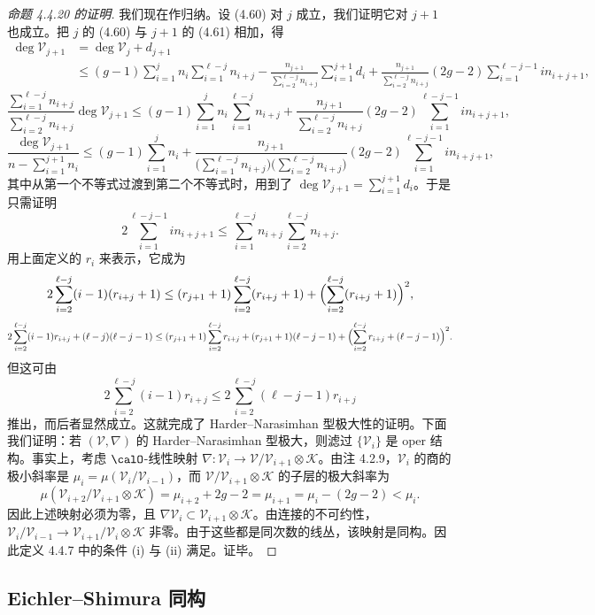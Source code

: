 \begin{proof}[命题 4.4.20 的证明]
我们现在作归纳。设 (4.60) 对 $j$ 成立，我们证明它对 $j+1$ 也成立。把 $j$ 的 (4.60) 与 $j+1$ 的 (4.61) 相加，得
\[
\begin{aligned}
\deg\mathcal{V}_{j+1}&=\deg\mathcal{V}_j+d_{j+1}\\
&\le(g-1)\sum_{i=1}^j n_i\sum_{i=1}^{\ell-j}n_{i+j}-\frac{n_{j+1}}{\sum_{i=2}^{\ell-j}n_{i+j}}\sum_{i=1}^{j+1}d_i+\frac{n_{j+1}}{\sum_{i=2}^{\ell-j}n_{i+j}}(2g-2)\sum_{i=1}^{\ell-j-1}in_{i+j+1},
\end{aligned}
\]
\[
\frac{\sum_{i=1}^{\ell-j}n_{i+j}}{\sum_{i=2}^{\ell-j}n_{i+j}}\deg\mathcal{V}_{j+1}\le(g-1)\sum_{i=1}^j n_i\sum_{i=1}^{\ell-j}n_{i+j}+\frac{n_{j+1}}{\sum_{i=2}^{\ell-j}n_{i+j}}(2g-2)\sum_{i=1}^{\ell-j-1}in_{i+j+1},
\]
\[
\frac{\deg\mathcal{V}_{j+1}}{n-\sum_{i=1}^{j+1}n_i}\le(g-1)\sum_{i=1}^j n_i+\frac{n_{j+1}}{\bigl(\sum_{i=1}^{\ell-j}n_{i+j}\bigr)\bigl(\sum_{i=2}^{\ell-j}n_{i+j}\bigr)}(2g-2)\sum_{i=1}^{\ell-j-1}in_{i+j+1},
\]
其中从第一个不等式过渡到第二个不等式时，用到了 $\deg\mathcal{V}_{j+1}=\sum_{i=1}^{j+1}d_i$。于是只需证明
\[
2\sum_{i=1}^{\ell-j-1}in_{i+j+1}\le\sum_{i=1}^{\ell-j}n_{i+j}\sum_{i=2}^{\ell-j}n_{i+j}.
\]
用上面定义的 $r_i$ 来表示，它成为
\[
2\sum_{i=2}^{\ell-j}(i-1)(r_{i+j}+1)\le(r_{j+1}+1)\sum_{i=2}^{\ell-j}(r_{i+j}+1)+\Bigl(\sum_{i=2}^{\ell-j}(r_{i+j}+1)\Bigr)^2,
\]
\[
2\sum_{i=2}^{\ell-j}(i-1)r_{i+j}+(\ell-j)(\ell-j-1)\le(r_{j+1}+1)\sum_{i=2}^{\ell-j}r_{i+j}+(r_{j+1}+1)(\ell-j-1)+\Bigl(\sum_{i=2}^{\ell-j}r_{i+j}+(\ell-j-1)\Bigr)^2.
\]
但这可由
\[
2\sum_{i=2}^{\ell-j}(i-1)r_{i+j}\le2\sum_{i=2}^{\ell-j}(\ell-j-1)r_{i+j}
\]
推出，而后者显然成立。这就完成了 Harder--Narasimhan 型极大性的证明。下面我们证明：若 $(\mathcal{V},\nabla)$ 的 Harder--Narasimhan 型极大，则滤过 $\{\mathcal{V}_i\}$ 是 oper 结构。事实上，考虑 $\calO$-线性映射 $\nabla\colon\mathcal{V}_i\to\mathcal{V}/\mathcal{V}_{i+1}\otimes\mathcal{K}$。由注 4.2.9，$\mathcal{V}_i$ 的商的极小斜率是 $\mu_i=\mu(\mathcal{V}_i/\mathcal{V}_{i-1})$，而 $\mathcal{V}/\mathcal{V}_{i+1}\otimes\mathcal{K}$ 的子层的极大斜率为
\[
\mu(\mathcal{V}_{i+2}/\mathcal{V}_{i+1}\otimes\mathcal{K})=\mu_{i+2}+2g-2=\mu_{i+1}=\mu_i-(2g-2)<\mu_i.
\]
因此上述映射必须为零，且 $\nabla\mathcal{V}_i\subset\mathcal{V}_{i+1}\otimes\mathcal{K}$。由连接的不可约性，$\mathcal{V}_i/\mathcal{V}_{i-1}\to\mathcal{V}_{i+1}/\mathcal{V}_i\otimes\mathcal{K}$ 非零。由于这些都是同次数的线丛，该映射是同构。因此定义 4.4.7 中的条件 (i) 与 (ii) 满足。证毕。
\end{proof}

\subsection{Eichler--Shimura 同构}

